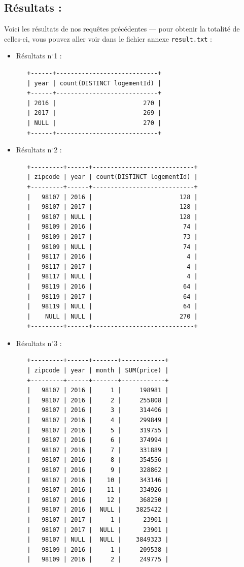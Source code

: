\documentclass[11pt, a4paper]{article}
\newcommand\tab{\hspace*{12.5mm}}
\begin{document}
\subsection{Résultats :}
\tab Voici les résultats de nos requêtes précédentes --- pour obtenir la totalité de celles-ci, vous pouvez aller voir dans le fichier annexe \Verb|result.txt| :
\lstset{basicstyle=\tiny}
\begin{itemize}[label=\textbullet]
   \item Résultats n$^\circ$1 :
   \begin{lstlisting}
   +------+----------------------------+
   | year | count(DISTINCT logementId) |
   +------+----------------------------+
   | 2016 |                        270 |
   | 2017 |                        269 |
   | NULL |                        270 |
   +------+----------------------------+
   \end{lstlisting}
   \item Résultats n$^\circ$2 :
   \begin{lstlisting}
   +---------+------+----------------------------+
   | zipcode | year | count(DISTINCT logementId) |
   +---------+------+----------------------------+
   |   98107 | 2016 |                        128 |
   |   98107 | 2017 |                        128 |
   |   98107 | NULL |                        128 |
   |   98109 | 2016 |                         74 |
   |   98109 | 2017 |                         73 |
   |   98109 | NULL |                         74 |
   |   98117 | 2016 |                          4 |
   |   98117 | 2017 |                          4 |
   |   98117 | NULL |                          4 |
   |   98119 | 2016 |                         64 |
   |   98119 | 2017 |                         64 |
   |   98119 | NULL |                         64 |
   |    NULL | NULL |                        270 |
   +---------+------+----------------------------+
   \end{lstlisting}
   \pagebreak
   \item Résultats n$^\circ$3 :
   \begin{lstlisting}
   +---------+------+-------+------------+
   | zipcode | year | month | SUM(price) |
   +---------+------+-------+------------+
   |   98107 | 2016 |     1 |     198981 |
   |   98107 | 2016 |     2 |     255808 |
   |   98107 | 2016 |     3 |     314406 |
   |   98107 | 2016 |     4 |     299849 |
   |   98107 | 2016 |     5 |     319755 |
   |   98107 | 2016 |     6 |     374994 |
   |   98107 | 2016 |     7 |     331889 |
   |   98107 | 2016 |     8 |     354556 |
   |   98107 | 2016 |     9 |     328862 |
   |   98107 | 2016 |    10 |     343146 |
   |   98107 | 2016 |    11 |     334926 |
   |   98107 | 2016 |    12 |     368250 |
   |   98107 | 2016 |  NULL |    3825422 |
   |   98107 | 2017 |     1 |      23901 |
   |   98107 | 2017 |  NULL |      23901 |
   |   98107 | NULL |  NULL |    3849323 |
   |   98109 | 2016 |     1 |     209538 |
   |   98109 | 2016 |     2 |     249775 |


\end{lstlisting}
\end{itemize}
\end{document}

